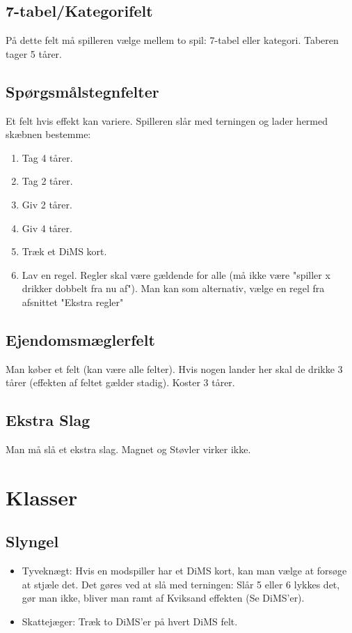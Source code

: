 \documentclass{article}
\begin{document}
\subsection{7-tabel/Kategorifelt}
På dette felt må spilleren vælge mellem to spil: 7-tabel eller kategori. Taberen tager 5 tårer.
 
\subsection{Spørgsmålstegnfelter}
Et felt hvis effekt kan variere. Spilleren slår med terningen og lader hermed skæbnen bestemme:
\begin{enumerate}
	\item Tag 4 tårer.
	\item Tag 2 tårer.
	\item Giv 2 tårer.
	\item Giv 4 tårer.
	\item Træk et DiMS kort.
	\item Lav en regel. Regler skal være gældende for alle (må ikke være "spiller x drikker dobbelt fra nu af"). Man kan som alternativ, vælge en regel fra afsnittet "Ekstra regler"
\end{enumerate}
 
\subsection{Ejendomsmæglerfelt}
Man køber et felt (kan være alle felter). Hvis nogen lander her skal de drikke 3 tårer (effekten af feltet gælder stadig). Koster 3 tårer.
 
\subsection{Ekstra Slag}
Man må slå et ekstra slag. Magnet og Støvler virker ikke.

\section{Klasser}
 
\subsection{Slyngel}
\begin{itemize}
	\item Tyveknægt: Hvis en modspiller har et DiMS kort, kan man vælge at forsøge at stjæle det. Det gøres ved at slå med terningen: Slår 5 eller 6 lykkes det, gør man ikke, bliver man ramt af Kviksand effekten (Se DiMS'er).
	\item Skattejæger: Træk to DiMS'er på hvert DiMS felt.
\end{itemize}
 
\end{document}
